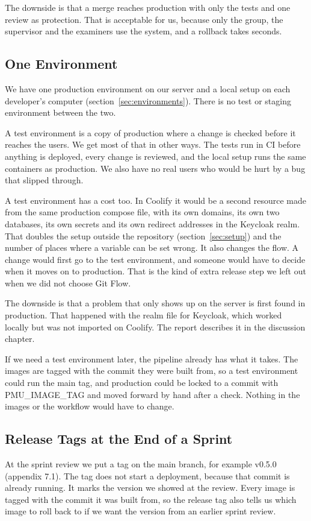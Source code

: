 \documentclass[a4paper,11pt]{article}
\begin{document}
The downside is that a merge reaches production with only the tests and one review as protection. That is acceptable for us, because only the group, the supervisor and the examiners use the system, and a rollback takes seconds.

\subsection{One Environment}
We have one production environment on our server and a local setup on each developer's computer (section~\ref{sec:environments}). There is no test or staging environment between the two.

A test environment is a copy of production where a change is checked before it reaches the users. We get most of that in other ways. The tests run in CI before anything is deployed, every change is reviewed, and the local setup runs the same containers as production. We also have no real users who would be hurt by a bug that slipped through.

A test environment has a cost too. In Coolify it would be a second resource made from the same production compose file, with its own domains, its own two databases, its own secrets and its own redirect addresses in the Keycloak realm. That doubles the setup outside the repository (section~\ref{sec:setup}) and the number of places where a variable can be set wrong. It also changes the flow. A change would first go to the test environment, and someone would have to decide when it moves on to production. That is the kind of extra release step we left out when we did not choose Git Flow.

The downside is that a problem that only shows up on the server is first found in production. That happened with the realm file for Keycloak, which worked locally but was not imported on Coolify. The report describes it in the discussion chapter.

If we need a test environment later, the pipeline already has what it takes. The images are tagged with the commit they were built from, so a test environment could run the main tag, and production could be locked to a commit with PMU\_IMAGE\_TAG and moved forward by hand after a check. Nothing in the images or the workflow would have to change.

\subsection{Release Tags at the End of a Sprint}
At the sprint review we put a tag on the main branch, for example v0.5.0 (appendix 7.1). The tag does not start a deployment, because that commit is already running. It marks the version we showed at the review. Every image is tagged with the commit it was built from, so the release tag also tells us which image to roll back to if we want the version from an earlier sprint review.
\end{document}
